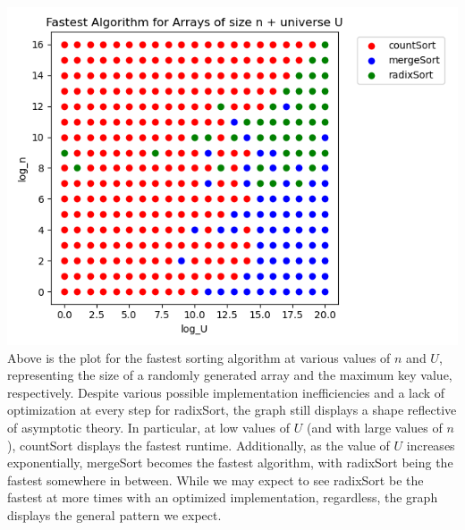 \documentclass[11pt]{article}
\begin{document}
\begin{enumerate}
\begin{enumerate}
            \includegraphics[]{fall2022/psets/ps1/algorithms_runtime_comparison.png} \\
            
            Above is the plot for the fastest sorting algorithm at various values of $n$ and $U$, representing the size of a randomly generated array and the maximum key value, respectively. Despite various possible implementation inefficiencies and a lack of optimization at every step for radixSort, the graph still displays a shape reflective of asymptotic theory. In particular, at low values of $U$ (and with large values of $n$), countSort displays the fastest runtime. Additionally, as the value of $U$ increases exponentially, mergeSort becomes the fastest algorithm, with radixSort being the fastest somewhere in between. While we may expect to see radixSort be the fastest at more times with an optimized implementation, regardless, the graph displays the general pattern we expect.
          
        \end{enumerate}

\end{enumerate}
\end{document}

